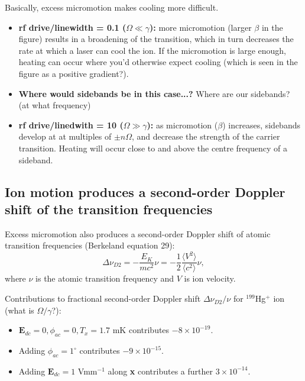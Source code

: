 \documentclass{article}
\begin{document}
Basically, excess micromotion makes cooling more difficult.

\begin{itemize}
\item \textbf{rf drive/linewidth = 0.1 ($\Omega \ll \gamma$):} more micromotion (larger $\beta$ in the figure) results in a broadening of the transition, which in turn decreases the rate at which a laser can cool the ion. If the micromotion is large enough, heating can occur where you'd otherwise expect cooling (which is seen in the figure as a positive gradient?). 

\item \textbf{Where would sidebands be in this case...?} Where are our sidebands? (at what frequency)

\item \textbf{rf drive/linedwith = 10 ($\Omega \gg \gamma$):} as micromotion ($\beta$) increases, sidebands develop at at multiples of $\pm n\Omega$, and decrease the strength of the carrier transition. Heating will occur close to and above the centre frequency of a sideband.
\end{itemize}


\subsection*{Ion motion produces a second-order Doppler shift of the transition frequencies}

Excess micromotion also produces a second-order Doppler shift of atomic transition frequencies (Berkeland equation 29):
%
\begin{equation}
\Delta \nu_{D2} = - \frac{E_K}{mc^2} \nu = -\frac{1}{2} \frac{\langle V^2 \rangle}{\langle c^2 \rangle} \nu,
\end{equation}
%
where $\nu$ is the atomic transition frequency and $V$ is ion velocity.

Contributions to fractional second-order Doppler shift $\Delta \nu_{D2} / \nu$ for $^{199}$Hg$^+$ ion (what is $\Omega/\gamma$?): 

\begin{itemize}
\item $\mathbf{E}_{dc} = 0, \phi_{ac} = 0, T_x = 1.7$ mK contributes $-8 \times 10^{-19}$.
\item Adding $\phi_{ac} = 1^{\circ}$ contributes $-9 \times 10^{-15}$.
\item Adding $\mathbf{E}_{dc} = 1$ Vmm$^{-1}$ along \textbf{x} contributes a further $3 \times 10^{-14}$.
\end{itemize}
\end{document}
